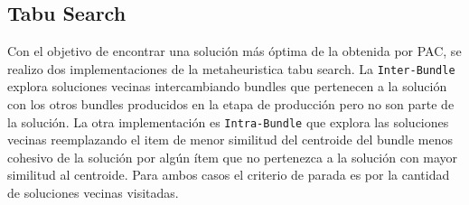 \subsection{Tabu Search}
Con el objetivo de encontrar una solución más óptima de la obtenida por PAC, se realizo dos implementaciones de la metaheuristica tabu search. La \texttt{Inter-Bundle} explora soluciones vecinas intercambiando bundles que pertenecen a la solución con los otros bundles producidos en la etapa de producción pero no son parte de la solución. La otra implementación es \texttt{Intra-Bundle} que explora las soluciones vecinas reemplazando el item de menor similitud del centroide del bundle menos cohesivo de la solución por algún ítem que no pertenezca a la solución con mayor similitud al centroide. Para ambos casos el criterio de parada es por la cantidad de soluciones vecinas visitadas.
